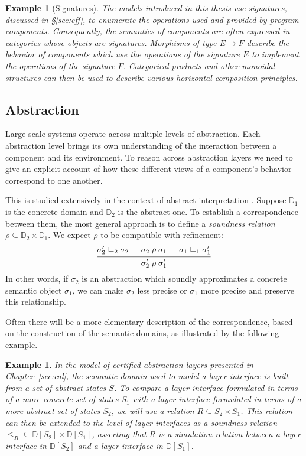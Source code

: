 \documentclass[11pt,oneside,draft]{book}
\newtheorem{example}[theorem]{Example}
\theoremstyle{definition}
\newcommand{\refby}{\sqsubseteq} %
\begin{document}
\begin{example}[Signatures] %
The models introduced in this thesis use \emph{signatures},
discussed in \S\ref{sec:eff},
to enumerate the operations used and provided by program components.
Consequently,
the semantics of components are often expressed in categories
whose objects are signatures.
Morphisms of type $E \rightarrow F$
describe the behavior of components 
which use the operations of the signature $E$
to implement the operations of the signature $F$.
Categorical products and other monoidal structures
can then be used to describe various
horizontal composition principles.
\end{example}


\subsection{Abstraction} %

Large-scale systems operate across multiple levels of abstraction.
Each abstraction level brings its own understanding of the interaction
between a component and its environment.
To reason across abstraction layers we need to give
an explicit account of how these different views
of a component's behavior
correspond to one another.

This is studied extensively
in the context of abstract interpretation \citep{aif}.
Suppose $\mathbb{D}_1$ is the concrete domain
and $\mathbb{D}_2$ is the abstract one.
To establish a correspondence between them,
the most general approach is to define a \emph{soundness relation}
$\rho \subseteq \mathbb{D}_2 \times \mathbb{D}_1$.
We expect $\rho$
to be compatible with refinement:
\[
  \begin{prooftree}
    \hypo{\sigma_2' \refby_2 \sigma_2}
    \hypo{\sigma_2 \mathrel{\rho} \sigma_1}
    \hypo{\sigma_1 \refby_1 \sigma_1'}
    \infer3{\sigma_2' \mathrel{\rho} \sigma_1'}
  \end{prooftree}
\]
In other words,
if $\sigma_2$ is an abstraction which soundly approximates
a concrete semantic object $\sigma_1$,
we can make $\sigma_2$ less precise or $\sigma_1$ more precise
and preserve this relationship.

Often there will be a more elementary description
of the correspondence,
based on the construction of the semantic domains,
as illustrated by the following example.

\begin{example} %
In the model of \emph{certified abstraction layers}
presented in Chapter~\ref{sec:cal},
the semantic domain used to model a layer interface
is built from a set of abstract states $S$.
To compare a layer interface formulated in terms of
a more concrete set of states $S_1$ with
a layer interface formulated in terms of
a more abstract set of states $S_2$,
we will use a relation $R \subseteq S_2 \times S_1$.
This relation can then be extended to the level of layer interfaces
as a soundness relation
${\le_R} \subseteq \mathbb{D}[S_2] \times \mathbb{D}[S_1]$,
asserting that $R$ is a simulation relation between
a layer interface in $\mathbb{D}[S_2]$ and
a layer interface in $\mathbb{D}[S_1]$.
\end{example}
\end{document}
